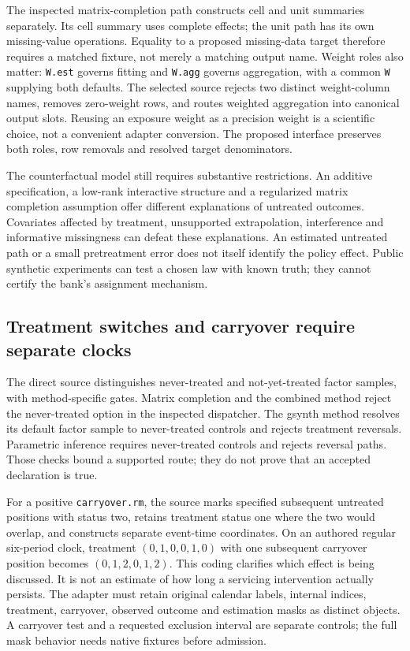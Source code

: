The inspected matrix-completion path constructs cell and unit summaries
separately. Its cell summary uses complete effects; the unit path has its
own missing-value operations. Equality to a proposed missing-data target
therefore requires a matched fixture, not merely a matching output name.
Weight roles also matter: \texttt{W.est} governs fitting and \texttt{W.agg}
governs aggregation, with a common \texttt{W} supplying both defaults.
The selected source rejects two distinct weight-column names, removes
zero-weight rows, and routes weighted aggregation into canonical output
slots. Reusing an exposure weight as a precision weight is a scientific
choice, not a convenient adapter conversion. The proposed interface
preserves both roles, row removals and resolved target denominators.
\citep{exec24_fect_source,exec21_gsynth_engine}

The counterfactual model still requires substantive restrictions. An
additive specification, a low-rank interactive structure and a regularized
matrix completion assumption offer different explanations of untreated
outcomes. Covariates affected by treatment, unsupported extrapolation,
interference and informative missingness can defeat these explanations.
An estimated untreated path or a small pretreatment error does not itself
identify the policy effect. Public synthetic experiments can test a chosen
law with known truth; they cannot certify the bank's assignment mechanism.
\citep{exec24_fect_choice}

\subsection{Treatment switches and carryover require separate clocks}
The direct source distinguishes never-treated and not-yet-treated factor
samples, with method-specific gates. Matrix completion and the combined
method reject the never-treated option in the inspected dispatcher.
The gsynth method resolves its default factor sample to never-treated
controls and rejects treatment reversals. Parametric inference requires
never-treated controls and rejects reversal paths. Those checks bound a
supported route; they do not prove that an accepted declaration is true.
\citep{exec24_fect_source}

For a positive \texttt{carryover.rm}, the source marks specified subsequent
untreated positions with status two, retains treatment status one where
the two would overlap, and constructs separate event-time coordinates.
On an authored regular six-period clock, treatment $(0,1,0,0,1,0)$ with
one subsequent carryover position becomes $(0,1,2,0,1,2)$. This coding
clarifies which effect is being discussed. It is not an estimate of how
long a servicing intervention actually persists. The adapter must retain
original calendar labels, internal indices, treatment, carryover, observed
outcome and estimation masks as distinct objects. A carryover test and a
requested exclusion interval are separate controls; the full mask behavior
needs native fixtures before admission.~\citep{exec24_fect_source,exec24_fect_choice}


